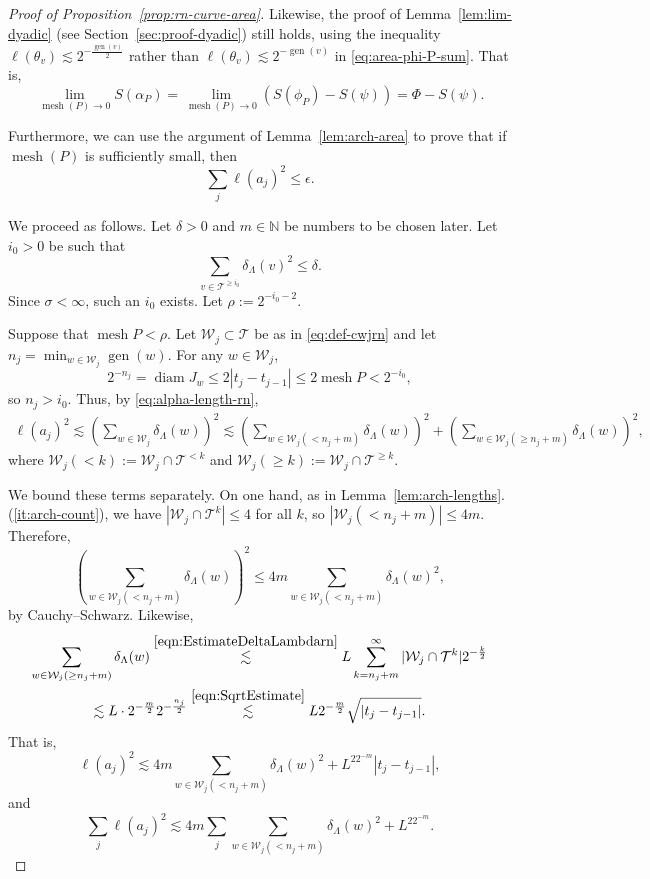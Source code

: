 \documentclass[12pt,reqno]{amsart}
\newcommand{\cT}{\mathcal{T}}
\newcommand{\cW}{\mathcal{W}}
\DeclareMathOperator{\mesh}{mesh}
\DeclareMathOperator{\gen}{gen}
\theoremstyle{remark}
\newcommand{\0}{\mathbf{0}}
\renewcommand{\1}{\mathbf 1}
\DeclareMathOperator{\diam}{diam}
\begin{document}
\begin{proof}[Proof of Proposition~\ref{prop:rn-curve-area}]
  Likewise, the proof of Lemma~\ref{lem:lim-dyadic} (see Section~\ref{sec:proof-dyadic}) still holds, using the inequality $\ell(\theta_v)\lesssim 2^{-\frac{\gen(v)}{2}}$ rather than $\ell(\theta_v)\lesssim 2^{-\gen(v)}$ in \eqref{eq:area-phi-P-sum}. That is,
  \begin{equation}\label{eq:lim-dyadic-conclusion}
    \lim_{\mesh(P)\to 0} S(\alpha_P) = \lim_{\mesh(P)\to 0} (S(\phi_P) - S(\psi)) = \Phi - S(\psi).
  \end{equation}
  
  Furthermore, we can use the argument of Lemma~\ref{lem:arch-area} to prove that if $\mesh(P)$ is sufficiently small, then
  \begin{equation}\label{eqn:ajepsilon}
    \sum_j \ell(a_j)^2\leq \epsilon.
  \end{equation}

  We proceed as follows. Let $\delta > 0$ and $m\in \mathbb{N}$ be numbers to be chosen later. Let $i_0>0$ be such that
  $$
  \sum_{v\in \cT^{\ge i_0}}\delta_\Lambda(v)^2 \le \delta.
  $$
  Since $\sigma<\infty$, such an $i_0$ exists.
  Let $\rho:=2^{-i_0-2}$.

  Suppose that $\mesh P < \rho$.
  Let $\cW_j\subset \cT$ be as in \eqref{eq:def-cwjrn} and let $n_j = \min_{w\in \cW_j} \gen(w)$. For any $w\in \cW_j$,
  \begin{equation}\label{eqn:SqrtEstimate}
  2^{-n_j}=\diam J_w \leq 2|t_j-t_{j-1}|\leq 2\mesh P < 2^{-i_0},
  \end{equation}
  so $n_j > i_0$. Thus, by \eqref{eq:alpha-length-rn},
  \[
  \begin{aligned}
    \ell(a_j)^2 \lesssim \left(\sum_{w\in \cW_j} \delta_\Lambda(w)\right)^2  
    \lesssim \left(\sum_{w\in \cW_j(<n_j + m)}\delta_\Lambda(w)\right)^2 + \left(\sum_{w\in \cW_j(\ge n_j + m)}\delta_\Lambda(w)\right)^2,
\end{aligned}
  \]
  where $\cW_j(< k) := \cW_j\cap \cT^{< k}$ and $\cW_j(\ge k) := \cW_j\cap \cT^{\ge k}$.

  We bound these terms separately. On one hand, as in Lemma~\ref{lem:arch-lengths}.(\ref{it:arch-count}), we have $|\cW_j\cap\cT^k|\le 4$ for all $k$, so $|\cW_j(<n_j + m)| \le 4m$. Therefore,
  $$
  \left(\sum_{w\in \cW_j(<n_j + m)}\delta_\Lambda(w)\right)^2 \le 4m \sum_{w\in \cW_j(<n_j + m)}\delta_\Lambda(w)^2,
  $$
  by Cauchy--Schwarz. Likewise,
  \begin{multline*}
    \sum_{w\in \cW_j(\ge n_j + m)}\delta_\Lambda(w)
    \stackrel{\eqref{eqn:EstimateDeltaLambdarn}}{\lesssim} L \sum_{k=n_j+m}^\infty |\cW_j\cap\cT^k| 2^{-\frac{k}{2}} \\
    \lesssim L \cdot 2^{-\frac{m}{2}} 2^{-\frac{n_j}{2}} \stackrel{\eqref{eqn:SqrtEstimate}}{\lesssim} L2^{-\frac{m}{2}}\sqrt{|t_j-t_{j-1}|}.
  \end{multline*}
  That is,
  $$\ell(a_j)^2\lesssim 4m \sum_{w\in \cW_j(<n_j + m)}\delta_\Lambda(w)^2 + L^22^{-m} |t_j-t_{j-1}|,$$
  and
  $$\sum_j \ell(a_j)^2\lesssim 4m \sum_j \sum_{w\in \cW_j(<n_j + m)}\delta_\Lambda(w)^2 + L^22^{-m}.$$


\end{proof}
\end{document}
